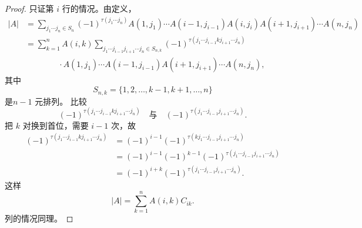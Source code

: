 \begin{proof}
	只证第 $i$ 行的情况。由定义，
	\[
	\begin{aligned}
		|A|
		&=\sum_{ j_1\cdots  j_n\in S_n}
		(-1)^{\tau( j_1\cdots j_n)}
		A(1, j_1)\cdots A(i-1, j_{i-1})A(i, j_i)A(i+1, j_{i+1})\cdots A(n, j_n)\\
		&=\sum_{k=1}^{n}A(i,k)
		\sum_{ j_1\cdots j_{i-1} j_{i+1}\cdots j_n\in S_{n,k}}
		(-1)^{\tau( j_1\cdots j_{i-1}k j_{i+1}\cdots j_n)}\\
		&\qquad\qquad\cdot
		A(1, j_1)\cdots A(i-1, j_{i-1})A(i+1, j_{i+1})\cdots A(n, j_n),
	\end{aligned}
	\]
	其中
	\[
	S_{n,k}=\{1,2,\ldots,k-1,k+1,\ldots,n\}
	\]
	是$n-1$ 元排列。
	比较
	\[
	(-1)^{\tau( j_1\cdots j_{i-1}k j_{i+1}\cdots j_n)}
	\quad\text{与}\quad
	(-1)^{\tau( j_1\cdots j_{i-1} j_{i+1}\cdots j_n)}.
	\]
	把 $k$ 对换到首位，需要 $i-1$ 次，故
	\[
	\begin{aligned}
		(-1)^{\tau( j_1\cdots j_{i-1}k j_{i+1}\cdots j_n)}
		&=(-1)^{i-1}(-1)^{\tau(k j_1\cdots j_{i-1} j_{i+1}\cdots j_n)}\\
		&=(-1)^{i-1}(-1)^{k-1}
		(-1)^{\tau( j_1\cdots j_{i-1} j_{i+1}\cdots j_n)}\\
		&=(-1)^{i+k}
		(-1)^{\tau( j_1\cdots j_{i-1} j_{i+1}\cdots j_n)}.
	\end{aligned}
	\]
	这样
	\[
	|A|=\sum_{k=1}^{n}A(i,k)C_{ik}.
	\]
	列的情况同理。
\end{proof}
